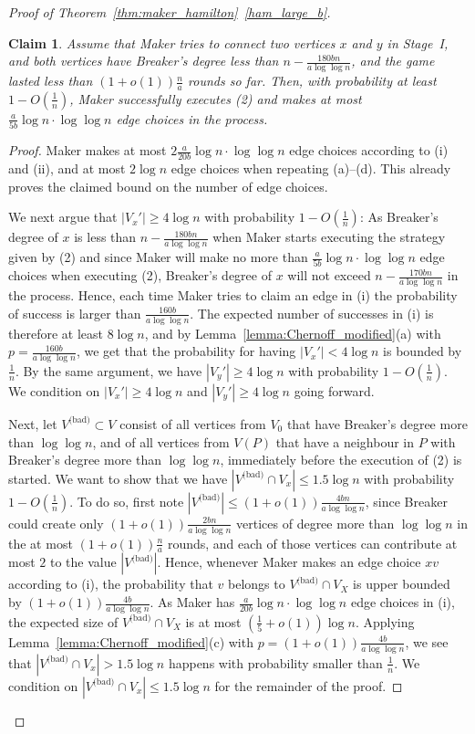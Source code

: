 \documentclass[11pt, a4paper]{article}
\numberwithin{equation}{section}
\numberwithin{figure}{section}
\newtheorem{claim}[theorem]{Claim}
\begin{document}
\begin{proof}[Proof of Theorem~\ref{thm:maker_hamilton}~\ref{ham_large_b}]
\begin{claim}\label{c:stage1(2)-ham}
    Assume that Maker tries to connect two vertices $x$ and $y$ in Stage~I, and both vertices have Breaker's degree less than $n - \frac{180bn}{a\log\log n}$, and the game lasted less than $(1+o(1))\frac{n}{a}$ rounds so far. Then, with probability at least $1 - O(\frac{1}{n})$, Maker successfully executes (2) and makes at most $\frac{a}{5b}\log n\cdot \log\log n$ edge choices in the process.
\end{claim}
\begin{proof}
    Maker makes at most 
    $2\frac{a}{20b}\log n\cdot \log\log n$ edge choices
    according to (i) and (ii), and at most 
    $2\log n$ edge choices when repeating (a)--(d).  
    This already proves the claimed bound on the number 
    of edge choices.

    We next argue that $|V_x'| \geq 4\log n$
    with probability $1-O(\frac{1}{n})$: 
    As Breaker's degree of $x$ is less than 
    $n - \frac{180bn}{a\log\log n}$ when Maker starts executing the strategy given by (2) and since Maker will make no more than $\frac{a}{5b}\log n\cdot \log\log n$ edge choices when executing (2), Breaker's degree of $x$ will not exceed 
$n - \frac{170bn}{a\log\log n}$ in the process.
Hence, each time Maker tries to claim an edge in (i)
the probability of success is larger than
$\frac{160b}{a\log\log n}$.
The expected number of successes in (i) is therefore at least $8\log n$, and by Lemma~\ref{lemma:Chernoff_modified}(a) with $p=\frac{160b}{a\log\log n}$, we get that
the probability for having $|V_x'| < 4\log n$ is bounded by $\frac{1}{n}$. 
By the same argument, we have $|V_y'| \geq 4\log n$
    with probability $1-O(\frac{1}{n})$.
We condition on $|V_x'| \geq 4\log n$ and $|V_y'| \geq 4\log n$ going forward.

Next, let $V^{\text{(bad)}} \subset V$ consist of all vertices from $V_0$ that have Breaker's degree more than $\log\log n$, and of all vertices from $V(P)$ that have a neighbour in $P$ with Breaker's degree more than $\log\log n$, immediately before the execution of (2) is started. 
We want to show that we have 
$|V^{\text{(bad)}} \cap V_x| \leq 1.5\log n$
with probability $1-O(\frac{1}{n})$.
To do so, first note 
$|V^{\text{(bad)}}|\leq (1+o(1))\frac{4bn}{a\log\log n}$, since
Breaker could create only $(1+o(1))\frac{2bn}{a\log\log n}$ vertices of degree more than $\log\log n$ in the at most $(1+o(1))\frac{n}{a}$ rounds, and each of those vertices can contribute at most $2$ to the value $|V^{\text{(bad)}}|$.
Hence, whenever Maker makes an edge choice $xv$ according to (i),
the probability that $v$ belongs to $V^{\text{(bad)}}\cap V_X$ is upper bounded by 
$(1+o(1))\frac{4b}{a\log\log n}$. 
As Maker has $\frac{a}{20b}\log n\cdot \log\log n$ 
edge choices in (i), the expected size of
$V^{\text{(bad)}}\cap V_X$ is at most $(\frac15 + o(1))\log n$.
Applying Lemma~\ref{lemma:Chernoff_modified}(c) with $p=(1+o(1))\frac{4b}{a\log\log n}$, we see that
$|V^{\text{(bad)}} \cap V_x| > 1.5\log n$ happens with probability smaller than $\frac{1}{n}$. We condition on $|V^{\text{(bad)}} \cap V_x| \leq 1.5\log n$ for the remainder of the proof. 


\end{proof}
\end{proof}
\end{document}
